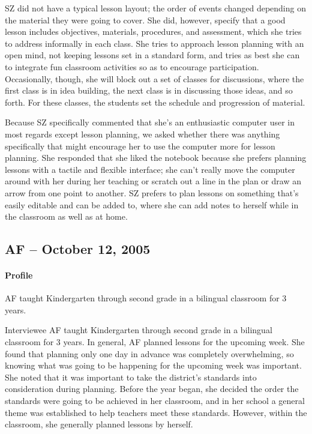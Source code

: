 \documentclass[12pt,titlepage]{article}
\begin{document}
SZ did not have a typical lesson layout; the order of events changed depending
on the material they were going to cover.  She did, however, specify that a good
lesson includes objectives, materials, procedures, and assessment, which she
tries to address informally in each class.  She tries to approach lesson
planning with an open mind, not keeping lessons set in a standard form, and
tries as best she can to integrate fun classroom activities so as to encourage
participation.  Occasionally, though, she will block out a set of classes for
discussions, where the first class is in idea building, the next class is in
discussing those ideas, and so forth.  For these classes, the students set the
schedule and progression of material.

Because SZ specifically commented that she's an enthusiastic computer user in
most regards except lesson planning, we asked whether there was anything
specifically that might encourage her to use the computer more for lesson
planning.  She responded that she liked the notebook because she prefers
planning lessons with a tactile and flexible interface; she can't really move
the computer around with her during her teaching or scratch out a line in the
plan or draw an arrow from one point to another.  SZ prefers to plan lessons on
something that's easily editable and can be added to, where she can add notes to
herself while in the classroom as well as at home.

\subsection{AF -- October 12, 2005}
\paragraph{Profile} AF taught Kindergarten through second grade in a bilingual
classroom for 3 years.

Interviewee AF taught Kindergarten through second grade in a bilingual classroom
for 3 years.  In general, AF planned lessons for the upcoming week.  She found
that planning only one day in advance was completely overwhelming, so knowing
what was going to be happening for the upcoming week was important.  She noted
that it was important to take the district's standards into consideration during
planning.  Before the year began, she decided the order the standards were going
to be achieved in her classroom, and in her school a general theme was
established to help teachers meet these standards.  However, within the
classroom, she generally planned lessons by herself.
\end{document}
